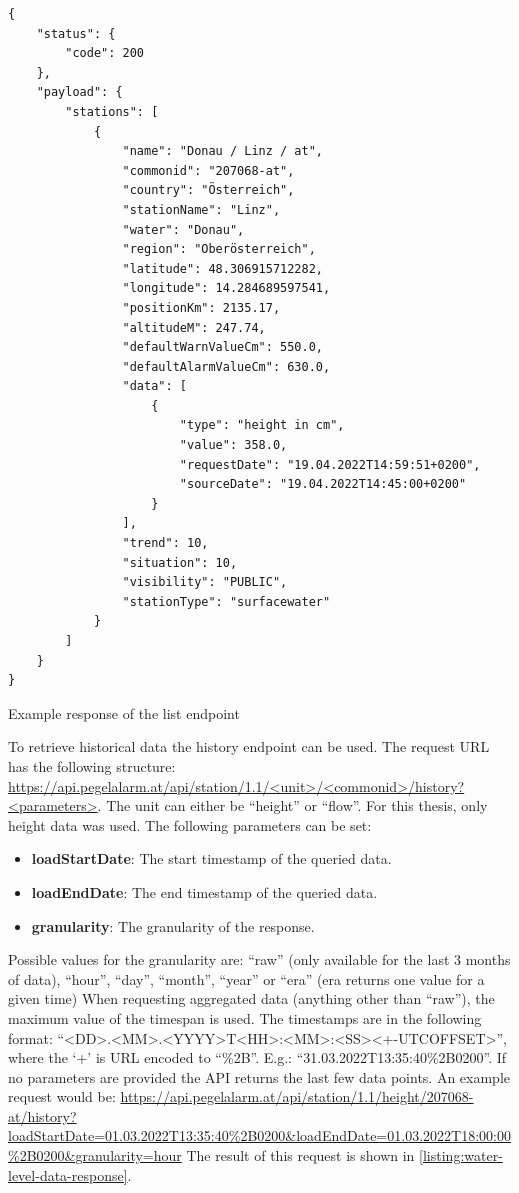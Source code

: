 \begin{listing}
\begin{verbatim}
{
    "status": {
        "code": 200
    },
    "payload": {
        "stations": [
            {
                "name": "Donau / Linz / at",
                "commonid": "207068-at",
                "country": "Österreich",
                "stationName": "Linz",
                "water": "Donau",
                "region": "Oberösterreich",
                "latitude": 48.306915712282,
                "longitude": 14.284689597541,
                "positionKm": 2135.17,
                "altitudeM": 247.74,
                "defaultWarnValueCm": 550.0,
                "defaultAlarmValueCm": 630.0,
                "data": [
                    {
                        "type": "height in cm",
                        "value": 358.0,
                        "requestDate": "19.04.2022T14:59:51+0200",
                        "sourceDate": "19.04.2022T14:45:00+0200"
                    }
                ],
                "trend": 10,
                "situation": 10,
                "visibility": "PUBLIC",
                "stationType": "surfacewater"
            }
        ]
    }
}
\end{verbatim}
\caption{Example response of the list endpoint}
\label{listing:response-list-endpoint}
\end{listing}
\newline
To retrieve historical data the history endpoint can be used. The request URL has the following structure: \url{https://api.pegelalarm.at/api/station/1.1/<unit>/<commonid>/history?<parameters>}. The unit can either be ``height'' or ``flow''. For this thesis, only height data was used. The following parameters can be set:
\begin{itemize}
    \item \textbf{loadStartDate}: The start timestamp of the queried data.
    \item \textbf{loadEndDate}: The end timestamp of the queried data.
    \item \textbf{granularity}: The granularity of the response. 
\end{itemize}
Possible values for the granularity are: ``raw'' (only available for the last 3 months of data), ``hour'', ``day'', ``month'', ``year'' or ``era'' (era returns one value for a given time)
When requesting aggregated data (anything other than ``raw''), the maximum value of the timespan is used. The timestamps are in the following format: ``<DD>.<MM>.<YYYY>T<HH>:<MM>:<SS><+-UTCOFFSET>'', where the `+' is URL encoded to ``\%2B''. E.g.: ``31.03.2022T13:35:40\%2B0200''. If no parameters are provided the API returns the last few data points.
\newline
An example request would be: \url{https://api.pegelalarm.at/api/station/1.1/height/207068-at/history?loadStartDate=01.03.2022T13:35:40%2B0200&loadEndDate=01.03.2022T18:00:00%2B0200&granularity=hour} The result of this request is shown in \autoref{listing:water-level-data-response}.

